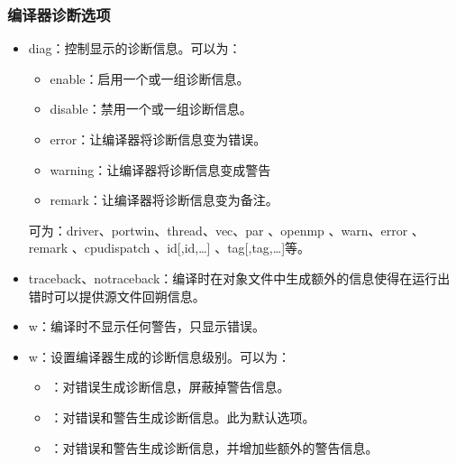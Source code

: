 \documentclass[a4paper,12pt,english]{sphinxmanual}
\begin{document}
\subsubsection{编译器诊断选项}
\label{\detokenize{compiler/intel:id12}}\begin{itemize}
\item {} 
\sphinxAtStartPar
\sphinxhyphen{}diag\sphinxhyphen{}：控制显示的诊断信息。可以为：
\begin{itemize}
\item {} 
\sphinxAtStartPar
enable：启用一个或一组诊断信息。

\item {} 
\sphinxAtStartPar
disable：禁用一个或一组诊断信息。

\item {} 
\sphinxAtStartPar
error：让编译器将诊断信息变为错误。

\item {} 
\sphinxAtStartPar
warning：让编译器将诊断信息变成警告

\item {} 
\sphinxAtStartPar
remark：让编译器将诊断信息变为备注。

\end{itemize}

\sphinxAtStartPar
{}可为：driver、port\sphinxhyphen{}win、thread、vec、par 、openmp 、warn、error 、remark 、cpu\sphinxhyphen{}dispatch 、id{[},id,…{]} 、tag{[},tag,…{]}等。

\item {} 
\sphinxAtStartPar
\sphinxhyphen{}traceback、\sphinxhyphen{}notraceback：编译时在对象文件中生成额外的信息使得在运行出错时可以提供源文件回朔信息。

\item {} 
\sphinxAtStartPar
\sphinxhyphen{}w：编译时不显示任何警告，只显示错误。

\item {} 
\sphinxAtStartPar
\sphinxhyphen{}w：设置编译器生成的诊断信息级别。可以为：
\begin{itemize}
\item {} 
：对错误生成诊断信息，屏蔽掉警告信息。

\item {} 
：对错误和警告生成诊断信息。此为默认选项。

\item {} 
：对错误和警告生成诊断信息，并增加些额外的警告信息。


\end{itemize}
\end{itemize}
\end{document}
